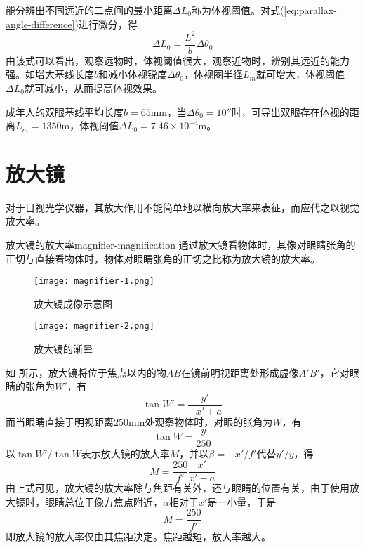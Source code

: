 能分辨出不同远近的二点间的最小距离$\Delta L_0$称为体视阈值。对式(\ref{eq:parallax-angle-difference})进行微分，得
\begin{equation}
\Delta L_0=\frac{L^2}{b}\Delta\theta_0
\end{equation}
由该式可以看出，观察远物时，体视阈值很大，观察近物时，辨别其远近的能力强。如增大基线长度$b$和减小体视锐度$\Delta\theta_0$，体视圈半径$L_m$就可增大，体视阈值$\Delta L_0$就可减小，从而提高体视效果。

\begin{note}
成年人的双眼基线平均长度$b=65\mathrm{mm}$，当$\Delta\theta_0=10''$时，可导出双眼存在体视的距离$L_m=1350\mathrm{m}$，体视阈值$\Delta L_0=7.46\times10^{-4}\mathrm{m}$。
\end{note}

\section{放大镜}
\label{sect:magnifier}
对于目视光学仪器，其放大作用不能简单地以横向放大率来表征，而应代之以视觉放大率。
\begin{definition}{放大镜的放大率}{magnifier-magnification}
	通过放大镜看物体时，其像对眼睛张角的正切与直接看物体时，物体对眼睛张角的正切之比称为放大镜的放大率。
\end{definition}

\begin{figure}[htbp]
	\centering
	\begin{minipage}[t]{0.48\textwidth}
		\centering
		\texttt{[image: magnifier-1.png]}
		\caption{放大镜成像示意图}
		\label{fig:magnifier-1}
	\end{minipage}
	\quad
	\begin{minipage}[t]{0.48\textwidth}
		\centering
		\texttt{[image: magnifier-2.png]}
		\caption{放大镜的渐晕}
		\label{fig:magnifier-2}
	\end{minipage}
\end{figure}

如 所示，放大镜将位于焦点以内的物$AB$在镜前明视距离处形成虚像$A'B'$，它对眼睛的张角为$W'$，有
\begin{equation}
\tan W'=\frac{y'}{-x'+a}
\end{equation}
而当眼睛直接于明视距离$250\mathrm{mm}$处观察物体时，对眼的张角为$W$，有
\begin{equation}
\tan W=\frac{y}{250}
\end{equation}
以$\tan W'/\tan W$表示放大镜的放大率$M$，并以$\beta=-x'/f'$代替$y'/y$，得
\begin{equation}
M=\frac{250}{f'}\frac{x'}{x'-a}
\end{equation}
由上式可见，放大镜的放大率除与焦距有关外，还与眼睛的位置有关，由于使用放大镜时，眼睛总位于像方焦点附近，$\alpha$相对于$x'$是一小量，于是
\begin{equation}
M=\frac{250}{f'}
\end{equation}
即放大镜的放大率仅由其焦距决定。焦距越短，放大率越大。

